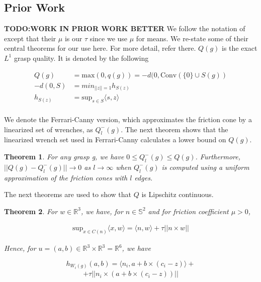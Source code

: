 \documentclass[letterpaper, 10 pt, conference]{ieeeconf}  %
\newtheorem{theorem}{Theorem}
\begin{document}
\subsection{Prior Work}

\textbf{TODO:WORK IN PRIOR WORK BETTER}
We follow the notation of \cite{pokorny2013classical} except that their $\mu$ is our $\tau$ since we use $\mu$ for means.  
We re-state some of their central theorems for our use here.
For more detail, refer there.
$Q(g)$ is the exact $L^1$ grasp quality.
It is denoted by the following 

\begin{align}
  Q(g) &= \mbox{max}(0,q(g)) = -d(0,\mbox{Conv}(\{0\} \cup S(g))\\
-d(0,S) &= min_{||z|| = 1} h_{S(z)}\\
h_{S(z)} &= \mbox{sup}_{s\in S}\langle s,z\rangle\\
\end{align}

We denote the Ferrari-Canny version, which approximates the friction cone by a linearized set of wrenches\cite{ferrari1992}, as $Q^-_l(g)$.
The next theorem shows that the linearized wrench set used in Ferrari-Canny calculates a lower bound on $Q(g)$.\\

\begin{theorem}
  \cite{pokorny2013classical}
For any grasp g, we have $0 \leq Q_l^-(g) \leq Q(g)$.
Furthermore, $||Q(g) - Q^-_l(g)|| \rightarrow 0$ as $l \rightarrow \infty$ when $Q_l^-(g)$ is computed using a uniform approximation of the friction cones with $l$ edges. \\
\end{theorem}

The next theorems are used to show that $Q$ is Lipschitz continuous.

\begin{theorem}
\label{lemma35}
  \cite{pokorny2013classical}
For $w \in \mathbb{R}^3$, we have, for $n \in \mathbb{S}^2$ and for friction coefficient $\mu > 0$, 

\begin{align}
\mbox{sup}_{x \in C(n)} \langle x,w \rangle = \langle n,w \rangle + \tau||n \times w||
\end{align}

Hence, for $u = (a,b) \in \mathbb{R}^3 \times \mathbb{R}^3 = \mathbb{R}^6$, we have 

\[
h_{W_i(g)}(a,b) =
 \langle n_i,a+b\times(c_i-z)\rangle +
\]
\begin{align}
 +\tau ||n_i \times (a+b\times(c_i-z))||
\end{align}

\end{theorem}
\end{document}

